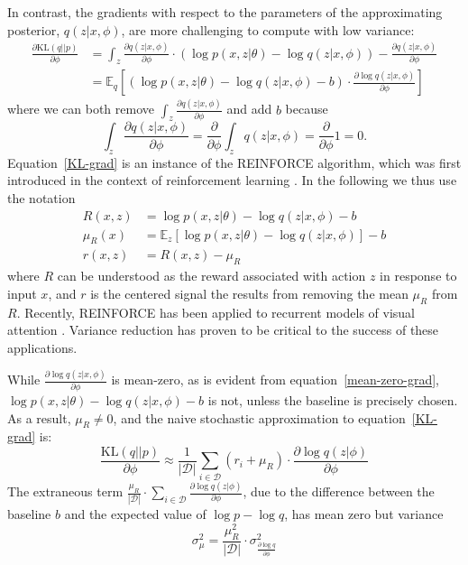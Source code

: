 \documentclass{article} %
\def\KL{\text{KL}}
\begin{document}
In contrast, the gradients with respect to the parameters of the approximating posterior, $q(z | x, \phi)$, are more challenging to compute with low variance:
\begin{align}
\frac{\partial \KL (q || p)}{\partial \phi} &= \int_z \frac{\partial q(z | x, \phi)}{\partial \phi}  \cdot \left( \log p(x,z | \theta) - \log q(z | x, \phi) \right) 
- \frac{\partial q(z | x, \phi)}{\partial \phi} \nonumber \\
&= \mathbb{E}_{q} \left[ \left( \log p(x,z | \theta) - \log q(z | x, \phi) - b \right) \cdot \frac{ \partial \log q(z | x, \phi)}{\partial \phi} \right] \label{KL-grad}
\end{align}
where we can both remove $\int_z \frac{\partial q(z | x, \phi)}{\partial \phi}$ and add $b$ because
\begin{equation} \label{mean-zero-grad}
\int_z \frac{\partial q(z | x, \phi)}{\partial \phi} = \frac{\partial}{\partial \phi} \int_z q(z | x, \phi) = \frac{\partial}{\partial \phi} 1 = 0.
\end{equation}
Equation~\ref{KL-grad} is an instance of the REINFORCE algorithm, which was first introduced in the context of reinforcement learning \cite{williams1992simple, bengio2013estimating}.  In the following we thus use the notation
\begin{align*}
R(x,z) &= \log p(x,z | \theta) - \log q(z | x, \phi) - b \\ 
\mu_R(x) &= \mathbb{E}_z \left[ \log p(x,z | \theta) - \log q(z | x, \phi) \right] - b \\
r(x,z) &= R(x,z) - \mu_R
\end{align*}
where $R$ can be understood as the reward associated with action $z$ in response to input $x$, and $r$ is the centered signal the results from removing the mean $\mu_R$ from $R$.  Recently, REINFORCE has been applied to recurrent models of visual attention \cite{mnih2014recurrent, xu2015show}.  Variance reduction has proven to be critical to the success of these applications.  

While $\frac{\partial \log q(z | x, \phi)}{\partial \phi}$ is mean-zero, as is evident from equation~\ref{mean-zero-grad}, $\log p(x,z|\theta) - \log q(z | x, \phi) -b $ is not, unless the baseline is precisely chosen.  As a result, $\mu_R \not= 0$, and the naive stochastic approximation to equation~\ref{KL-grad} is:
\begin{equation} \label{baseline-stochastic-approximation}
\frac{\KL (q || p)}{\partial \phi} \approx \frac{1}{|\mathcal{D}|} \sum_{i \in \mathcal{D}} \left( r_i + \mu_R \right) \cdot \frac{\partial \log q(z|\phi)}{\partial \phi}
\end{equation}
The extraneous term $\frac{\mu_R}{|\mathcal{D}|} \cdot \sum_{i \in \mathcal{D}} \frac{\partial \log q(z|\phi)}{\partial \phi}$, due to the difference between the baseline $b$ and the expected value of $\log p - \log q$, has mean zero but variance
\begin{equation*}
\sigma_{\mu}^2 = \frac{\mu_R^2}{|\mathcal{D} |} \cdot \sigma_{\frac{\partial \log q}{\partial \phi}}^2
\end{equation*}
\end{document}
